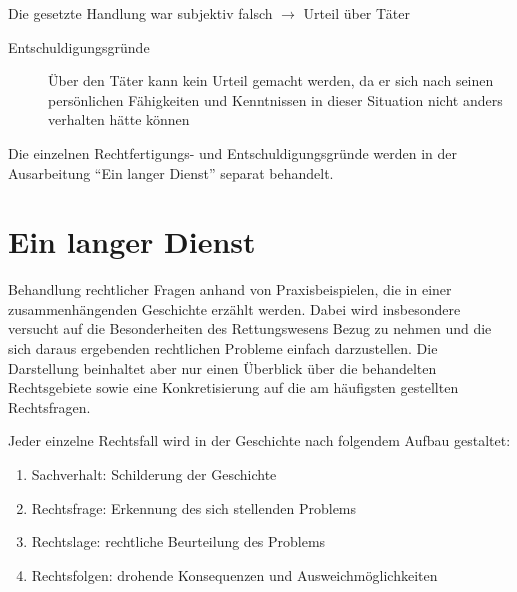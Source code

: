 {
Die gesetzte Handlung war subjektiv falsch ${\rightarrow}$ Urteil über
Täter

\begin{description}
    \item[Entschuldigungsgründe] Über den Täter kann kein Urteil gemacht werden, da er sich nach
    seinen persönlichen   Fähigkeiten und Kenntnissen in dieser
    Situation nicht anders verhalten hätte können
\end{description}



Die einzelnen Rechtfertigungs- und Entschuldigungsgründe werden in der
Ausarbeitung "`Ein langer Dienst"'
separat behandelt.
}{}{}{}{}





\clearpage

\section{Ein langer Dienst}

{\centering
{}
\par}

{
Behandlung rechtlicher Fragen anhand von Praxisbeispielen, die in einer
zusammenhängenden Geschichte erzählt werden. Dabei wird
insbesondere versucht auf die Besonderheiten des Rettungswesens Bezug
zu nehmen und die sich daraus ergebenden rechtlichen Probleme einfach
darzustellen. Die Darstellung beinhaltet aber nur einen Überblick
über die behandelten Rechtsgebiete sowie eine Konkretisierung auf die
am häufigsten gestellten Rechtsfragen.
}{}{}{}{}



{
Jeder einzelne Rechtsfall wird in der Geschichte nach folgendem Aufbau
gestaltet:

\begin{enumerate}
    \item Sachverhalt: Schilderung der Geschichte
    \item Rechtsfrage: Erkennung des sich stellenden Problems
    \item Rechtslage: rechtliche Beurteilung des Problems
    \item Rechtsfolgen: drohende Konsequenzen und Ausweichmöglichkeiten
\end{enumerate}
}{}{}{}{}


